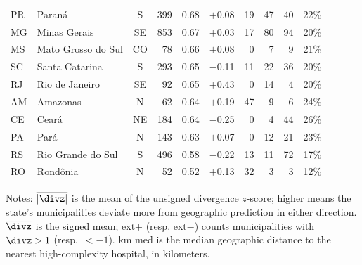 \begin{table}[ht]
\begin{tabular}{llcrrrrrrr}
  PR & Paran{\'a} & S &   399 & 0.68 & $+$0.08 & 19 &  47 &  40 & 22\% \\
  MG & Minas Gerais & SE &   853 & 0.67 & $+$0.03 & 17 &  80 &  94 & 20\% \\
  MS & Mato Grosso do Sul & CO &    78 & 0.66 & $+$0.08 & 0 &   7 &   9 & 21\% \\
  SC & Santa Catarina & S &   293 & 0.65 & $-$0.11 & 11 &  22 &  36 & 20\% \\
  RJ & Rio de Janeiro & SE &    92 & 0.65 & $+$0.43 & 0 &  14 &   4 & 20\% \\
  AM & Amazonas & N &    62 & 0.64 & $+$0.19 & 47 &   9 &   6 & 24\% \\
  CE & Cear{\'a} & NE &   184 & 0.64 & $-$0.25 & 0 &   4 &  44 & 26\% \\
  PA & Par{\'a} & N &   143 & 0.63 & $+$0.07 & 0 &  12 &  21 & 23\% \\
  RS & Rio Grande do Sul & S &   496 & 0.58 & $-$0.22 & 13 &  11 &  72 & 17\% \\
  RO & Rond{\^o}nia & N &    52 & 0.52 & $+$0.13 & 32 &   3 &   3 & 12\% \\
\bottomrule
\end{tabular}
\medskip

\footnotesize
Notes: $\overline{|\divz|}$ is the mean of the unsigned divergence $z$-score; higher means the state's municipalities deviate more from geographic prediction in either direction. $\overline{\divz}$ is the signed mean; ext$+$ (resp. ext$-$) counts municipalities with $\divz > 1$ (resp.\ $< -1$). km med is the median geographic distance to the nearest high-complexity hospital, in kilometers.
\end{table}
